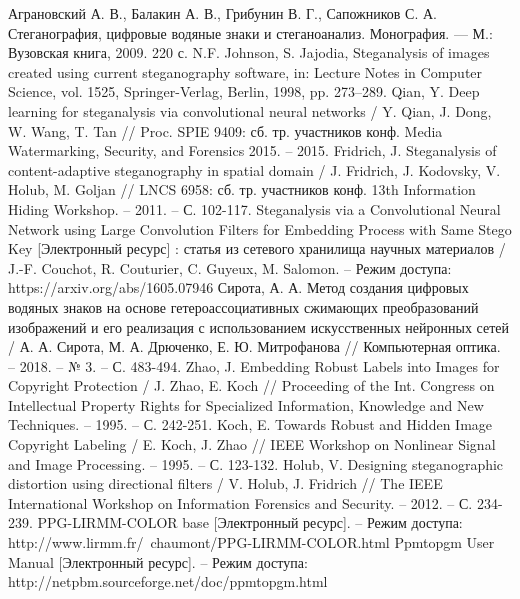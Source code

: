 {\def\section*#1{}
\begin{thebibliography}{99}
 Аграновский А. В., Балакин А. В., Грибунин В. Г., Сапожников С. А. Стеганография, цифровые водяные знаки и стеганоанализ. Монография. — М.: Вузовская книга, 2009. 220 с.
 N.F. Johnson, S. Jajodia, Steganalysis of images created using current steganography software, in: Lecture Notes in Computer Science, vol. 1525,
Springer-Verlag, Berlin, 1998, pp. 273–289.
 Qian, Y. Deep learning for steganalysis via convolutional neural networks / Y. Qian, J. Dong, W. Wang, T. Tan // Proc. SPIE 9409: сб. тр. участников конф. Media Watermarking, Security, and Forensics 2015. – 2015.
 Fridrich, J. Steganalysis of content-adaptive steganography in spatial domain / J. Fridrich, J. Kodovsky, V. Holub, M. Goljan // LNCS 6958: сб. тр. участников конф. 13th Information Hiding Workshop. – 2011. – С. 102-117.
 Steganalysis via a Convolutional Neural Network using Large Convolution Filters for Embedding Process with Same Stego Key [Электронный ресурс] : статья из сетевого хранилища научных материалов / J.-F. Couchot, R. Couturier, C. Guyeux, M. Salomon. – Режим доступа: https://arxiv.org/abs/1605.07946
 Сирота, А. А. Метод создания цифровых водяных знаков на основе гетероассоциативных сжимающих преобразований изображений и его реализация с использованием искусственных нейронных сетей / А. А. Сирота, М. А. Дрюченко, Е. Ю. Митрофанова // Компьютерная оптика. – 2018. – № 3. – С. 483-494. 
 Zhao, J. Embedding Robust Labels into Images for Copyright Protection / J. Zhao, E. Koch // Proceeding of the Int. Congress on Intellectual Property Rights for Specialized Information, Knowledge and New Techniques. – 1995. – С. 242-251.
 Koch, E. Towards Robust and Hidden Image Copyright Labeling / E. Koch, J. Zhao // IEEE Workshop on Nonlinear Signal and Image Processing. – 1995. – С. 123-132.
 Holub, V. Designing steganographic distortion using directional filters / V. Holub, J. Fridrich // The IEEE International Workshop on Information Forensics and Security. – 2012. – С. 234-239.
 PPG-LIRMM-COLOR base [Электронный ресурс]. – Режим доступа: http://www.lirmm.fr/~chaumont/PPG-LIRMM-COLOR.html
 Ppmtopgm User Manual [Электронный ресурс]. – Режим доступа: http://netpbm.sourceforge.net/doc/ppmtopgm.html
\end{thebibliography}
}
\clearpage
